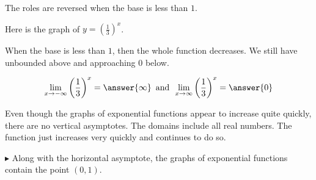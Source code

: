 \documentclass{ximera}
\begin{document}
\begin{example}
The roles are reversed when the base is less than $1$.










Here is the graph of $y = \left(\frac{1}{3}\right)^x$.

\begin{image}
\end{image}


When the base is less than $1$, then the whole function decreases.  We still have unbounded above and approaching $0$ below.

\[  \lim_{x \to -\infty} \left(\frac{1}{3}\right)^x = \answer{\infty}     \, \text{ and } \,  \lim_{x \to \infty} \left(\frac{1}{3}\right)^x = \answer{0}   \]

\end{example}


Even though the graphs of exponential functions appear to increase quite quickly, there are no vertical asymptotes.  The domains include all real numbers.  The function just increases very quickly and continues to do so.



$\blacktriangleright$ Along with the horizontal asymptote, the graphs of exponential functions contain the point $(0, 1)$.
\end{document}
